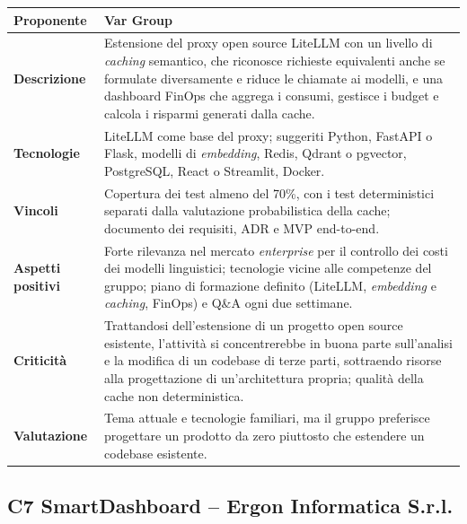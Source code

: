 \begin{longtable}{|>{\raggedright\arraybackslash}p{3.2cm}|>{\raggedright\arraybackslash}p{\dimexpr\textwidth-3.2cm-4\tabcolsep-3\arrayrulewidth\relax}|}
    \hline
    \textbf{Proponente} & Var Group \\
    \hline
    \textbf{Descrizione} & Estensione del proxy open source LiteLLM con un livello di \emph{caching} semantico, che riconosce richieste equivalenti anche se formulate diversamente e riduce le chiamate ai modelli, e una dashboard FinOps che aggrega i consumi, gestisce i budget e calcola i risparmi generati dalla cache. \\
    \hline
    \textbf{Tecnologie} & LiteLLM come base del proxy; suggeriti Python, FastAPI o Flask, modelli di \emph{embedding}, Redis, Qdrant o pgvector, PostgreSQL, React o Streamlit, Docker. \\
    \hline
    \textbf{Vincoli} & Copertura dei test almeno del 70\%, con i test deterministici separati dalla valutazione probabilistica della cache; documento dei requisiti, ADR e MVP end-to-end. \\
    \hline
    \textbf{Aspetti positivi} & Forte rilevanza nel mercato \emph{enterprise} per il controllo dei costi dei modelli linguistici; tecnologie vicine alle competenze del gruppo; piano di formazione definito (LiteLLM, \emph{embedding} e \emph{caching}, FinOps) e Q\&A ogni due settimane. \\
    \hline
    \textbf{Criticità} & Trattandosi dell'estensione di un progetto open source esistente, l'attività si concentrerebbe in buona parte sull'analisi e la modifica di un codebase di terze parti, sottraendo risorse alla progettazione di un'architettura propria; qualità della cache non deterministica. \\
    \hline
    \textbf{Valutazione} & Tema attuale e tecnologie familiari, ma il gruppo preferisce progettare un prodotto da zero piuttosto che estendere un codebase esistente. \\
    \hline
\end{longtable}

\subsection{C7 SmartDashboard -- Ergon Informatica S.r.l.}


